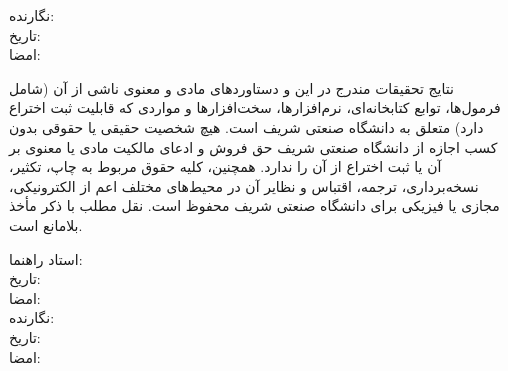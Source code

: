 {\begin{multicols}{2}
نگارنده: \ThesisAuthor\\
تاریخ: \\
امضا: \\
\end{multicols}

نتایج تحقیقات مندرج در این \ThesisType{} و دستاوردهای مادی و معنوی ناشی از آن (شامل فرمول‌ها، توابع کتابخانه‌ای، نرم‌افزارها، سخت‌افزارها و مواردی که قابلیت ثبت اختراع دارد) متعلق به دانشگاه صنعتی شریف است. هیچ شخصیت حقیقی یا حقوقی بدون کسب اجازه از دانشگاه صنعتی شریف حق فروش و ادعای مالکیت مادی یا معنوی بر آن یا ثبت اختراع از آن را ندارد. همچنین، کلیه حقوق مربوط به چاپ، تکثیر، نسخه‌برداری، ترجمه، اقتباس و نظایر آن در محیط‌های مختلف اعم از الکترونیکی، مجازی یا فیزیکی برای دانشگاه صنعتی شریف محفوظ است. نقل مطلب با ذکر مأخذ بلامانع است.


\begin{multicols}{2}
استاد راهنما: \ThesisSupervisor \\
تاریخ: \\
امضا: \\

نگارنده: \ThesisAuthor\\
تاریخ: \\
امضا: \\
\end{multicols}
}

